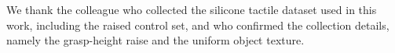 \documentclass[journal]{IEEEtran}
\begin{document}
We thank the colleague who collected the silicone tactile dataset used in this work,
including the raised control set, and who confirmed the collection details, namely
the grasp-height raise and the uniform object texture.
%
%
%




\end{document}
